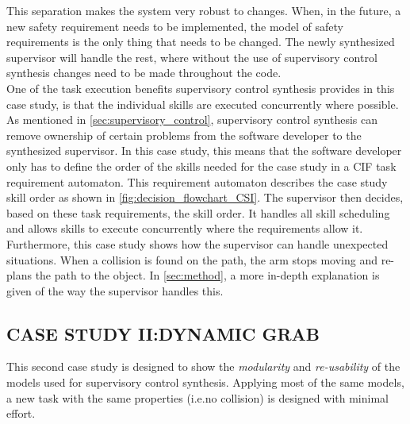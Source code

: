 This separation makes the system very robust to changes. 
When, in the future, a new safety requirement needs to be implemented, the model of safety requirements is the only thing that needs to be changed. 
The newly synthesized supervisor will handle the rest, where without the use of supervisory control synthesis changes need to be made throughout the code.\\

One of the task execution benefits supervisory control synthesis provides in this case study, is that the individual skills are executed concurrently where possible.
As mentioned in \cref{sec:supervisory_control}, supervisory control synthesis can remove ownership of certain problems from the software developer to the synthesized supervisor.
In this case study, this means that the software developer only has to define the order of the skills needed for the case study in a CIF task requirement automaton.%
This requirement automaton describes the case study skill order as shown in \cref{fig:decision_flowchart_CSI}.
The supervisor then decides, based on these task requirements, the skill order.
It handles all skill scheduling and allows skills to execute concurrently where the requirements allow it.\\

Furthermore, this case study shows how the supervisor can handle unexpected situations. When a collision is found on the path, the arm stops moving and re-plans the path to the object. In \cref{sec:method}, a more in-depth explanation is given of the way the supervisor handles this.\\



\subsection{CASE STUDY II:\@ DYNAMIC GRAB}\label{sec:cs2}
This second case study is designed to show the \textit{modularity} and \textit{re-usability} of the models used for supervisory control synthesis.
Applying most of the same models, a new task with the same properties (i.e.\@ no collision) is designed with minimal effort.\\

